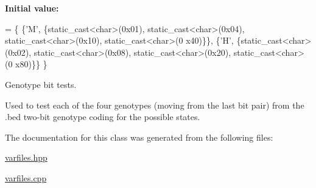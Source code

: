 {\bfseries Initial value\+:}
\begin{DoxyCode}
= \{
    \{\textcolor{charliteral}{'M'}, \{\textcolor{keyword}{static\_cast<}\textcolor{keywordtype}{char}\textcolor{keyword}{>}(0x01), static\_cast<char>(0x04), \textcolor{keyword}{static\_cast<}\textcolor{keywordtype}{char}\textcolor{keyword}{>}(0x10), static\_cast<char>(0
      x40)\}\},
    \{\textcolor{charliteral}{'H'}, \{\textcolor{keyword}{static\_cast<}\textcolor{keywordtype}{char}\textcolor{keyword}{>}(0x02), static\_cast<char>(0x08), \textcolor{keyword}{static\_cast<}\textcolor{keywordtype}{char}\textcolor{keyword}{>}(0x20), static\_cast<char>(0
      x80)\}\}
\}
\end{DoxyCode}


Genotype bit tests. 

Used to test each of the four genotypes (moving from the last bit pair) from the .bed two-\/bit genotype coding for the possible states. 

The documentation for this class was generated from the following files\+:\begin{DoxyCompactItemize}
\item 
\hyperlink{varfiles_8hpp}{varfiles.\+hpp}\item 
\hyperlink{varfiles_8cpp}{varfiles.\+cpp}\end{DoxyCompactItemize}
